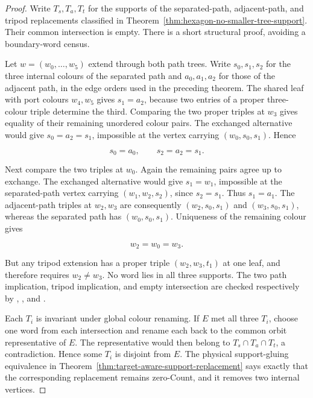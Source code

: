 \begin{proof}
Write \(T_s,T_a,T_t\) for the supports of the separated-path,
adjacent-path, and tripod replacements classified in
Theorem~\ref{thm:hexagon-no-smaller-tree-support}.  Their common intersection
is empty.  There is a short structural proof, avoiding a boundary-word
census.

Let \(w=(w_0,\ldots,w_5)\) extend through both path trees.  Write
\(s_0,s_1,s_2\) for the three internal colours of the separated path and
\(a_0,a_1,a_2\) for those of the adjacent path, in the edge orders used in
the preceding theorem.  The shared leaf with port colours \(w_4,w_5\) gives
\(s_1=a_2\), because two entries of a proper three-colour triple determine
the third.  Comparing the two proper triples at \(w_3\) gives equality of
their remaining unordered colour pairs.  The exchanged alternative would
give \(s_0=a_2=s_1\), impossible at the vertex carrying
\((w_0,s_0,s_1)\).  Hence

\[
                         s_0=a_0,\qquad s_2=a_2=s_1.
\]

Next compare the two triples at \(w_0\).  Again the remaining pairs agree up
to exchange.  The exchanged alternative would give \(s_1=w_1\), impossible
at the separated-path vertex carrying \((w_1,w_2,s_2)\), since
\(s_2=s_1\).  Thus \(s_1=a_1\).  The adjacent-path triples at \(w_2,w_3\)
are consequently \((w_2,s_0,s_1)\) and \((w_3,s_0,s_1)\), whereas the
separated path has \((w_0,s_0,s_1)\).  Uniqueness of the remaining colour
gives

\[
                              w_2=w_0=w_3.
\]

But any tripod extension has a proper triple
\((w_2,w_3,t_1)\) at one leaf, and therefore requires \(w_2\ne w_3\).  No
word lies in all three supports.  The two path implication, tripod
implication, and empty intersection are checked respectively by
,
,
and
.

Each \(T_i\) is invariant under global colour renaming.  If \(E\) met all
three \(T_i\), choose one word from each intersection and rename each back to
the common orbit representative of \(E\).  The representative would then
belong to \(T_s\cap T_a\cap T_t\), a contradiction.  Hence some \(T_i\) is
disjoint from \(E\).  The physical support-gluing equivalence in
Theorem~\ref{thm:target-aware-support-replacement} says exactly that the
corresponding replacement remains zero-Count, and it removes two internal
vertices.
\end{proof}

